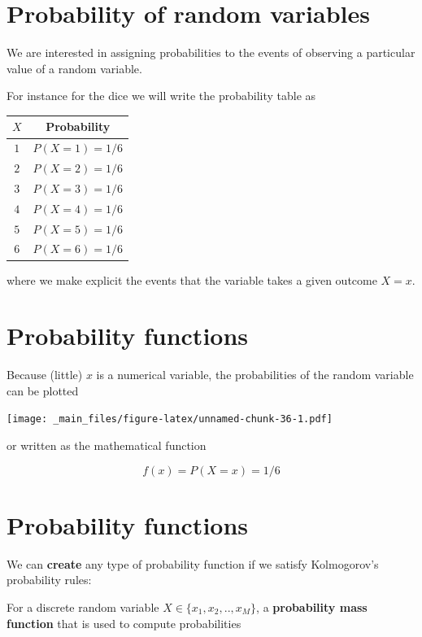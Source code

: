 \documentclass[
]{book}
\begin{document}
\hypertarget{probability-of-random-variables}{%
\section{Probability of random variables}\label{probability-of-random-variables}}

We are interested in assigning probabilities to the events of observing a particular value of a random variable.

For instance for the dice we will write the probability table as

\begin{longtable}[]{@{}cc@{}}
\toprule
\(X\) & Probability \\
\midrule
\endhead
\(1\) & \(P(X=1)=1/6\) \\
\(2\) & \(P(X=2)=1/6\) \\
\(3\) & \(P(X=3)=1/6\) \\
\(4\) & \(P(X=4)=1/6\) \\
\(5\) & \(P(X=5)=1/6\) \\
\(6\) & \(P(X=6)=1/6\) \\
\bottomrule
\end{longtable}

where we make explicit the events that the variable takes a given outcome \(X=x\).

\hypertarget{probability-functions}{%
\section{Probability functions}\label{probability-functions}}

Because (little) \(x\) is a numerical variable, the probabilities of the random variable can be plotted

\texttt{[image: \_main\_files/figure-latex/unnamed-chunk-36-1.pdf]}

or written as the mathematical function

\[f(x)=P(X=x)=1/6\]

\hypertarget{probability-functions-1}{%
\section{Probability functions}\label{probability-functions-1}}

We can \textbf{create} any type of probability function if we satisfy Kolmogorov's probability rules:

For a discrete random variable \(X \in \{x_1 , x_2 , .. , x_M\}\), a \textbf{probability mass function} that is used to compute probabilities
\end{document}
